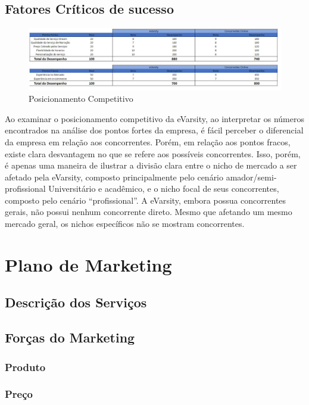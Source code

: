 \documentclass[a4paper, 12pt]{paper}
\begin{document}
\begin{landscape}
\subsection{Fatores Críticos de sucesso}
\begin{figure}[!ht]
    \centering
    \includegraphics[scale=0.56]{img/img08.png}
    \caption{Posicionamento Competitivo}
\end{figure}
Ao examinar o posicionamento competitivo da eVarsity, ao interpretar os números encontrados na análise dos pontos fortes da empresa, é fácil perceber o diferencial da empresa em relação aos concorrentes.  Porém, em relação aos pontos fracos, existe clara desvantagem no que se refere aos possíveis concorrentes. Isso, porém, é apenas uma maneira de ilustrar a divisão clara entre o nicho de mercado a ser afetado pela eVarsity, composto principalmente pelo cenário amador/semi-profissional Universitário e acadêmico, e o nicho focal de seus concorrentes, composto pelo cenário “profissional”. A eVarsity, embora possua concorrentes gerais, não possui nenhum concorrente direto. Mesmo que afetando um mesmo mercado geral, os nichos específicos não se mostram concorrentes.
\end{landscape}



\newpage
\section{Plano de Marketing}
\subsection{Descrição dos Serviços}
\subsection{Forças do Marketing}
\subsubsection{Produto}
\subsubsection{Preço}
\end{document}
